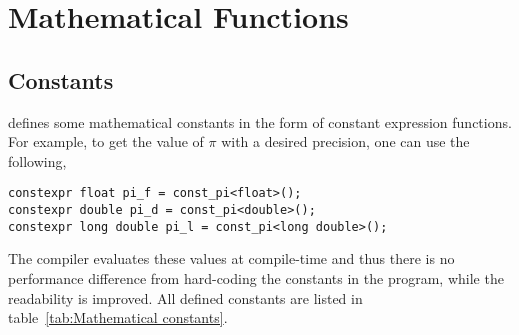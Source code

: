 %
%
%
%

\chapter{Mathematical Functions}
\label{chap:Mathemtical Functions}

\section{Constants}
\label{sec:Constants}

\mckl defines some mathematical constants in the form of constant expression
functions. For example, to get the value of $\pi$ with a desired precision, one
can use the following,
\begin{verbatim}
constexpr float pi_f = const_pi<float>();
constexpr double pi_d = const_pi<double>();
constexpr long double pi_l = const_pi<long double>();
\end{verbatim}
The compiler evaluates these values at compile-time and thus there is no
performance difference from hard-coding the constants in the program, while the
readability is improved. All defined constants are listed in
table~\ref{tab:Mathematical constants}.

